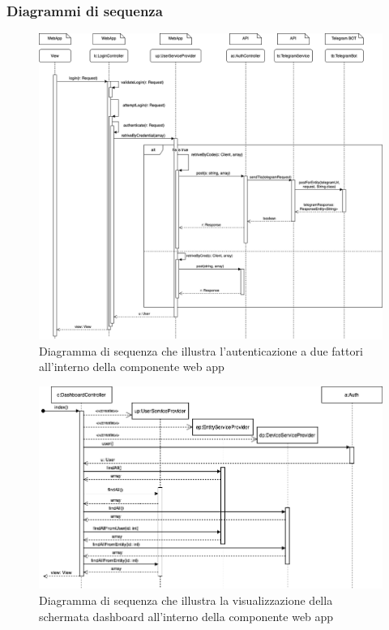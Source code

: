\begin{landscape}
	\subsubsection{Diagrammi di sequenza}%
		\begin{figure}[H]
			\centering
			\includegraphics[scale=0.425]{res/images/WEBAPP/AutenticazioneTfa.png}
			\caption{Diagramma di sequenza che illustra l'autenticazione a due fattori all'interno della componente web app}
			\label{Diagramma 23}
		\end{figure}
		\begin{figure}[H]
			\centering
			\includegraphics[scale=0.600]{res/images/WEBAPP/Dashboard.index.png}
			\caption{Diagramma di sequenza che illustra la visualizzazione della schermata dashboard all'interno della componente web app}
			\label{Diagramma 24}
		\end{figure}
	\end{landscape}